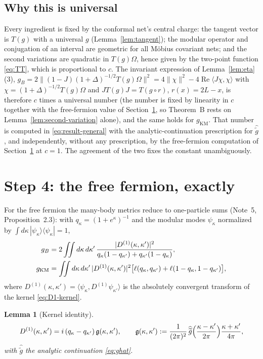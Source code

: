\documentclass[11pt]{article}
\theoremstyle{accent}
\newtheorem{lemma}[theorem]{Lemma}
\theoremstyle{definition}
\newcommand{\gh}{\widehat{\widetilde g}}
\begin{document}
\subsection{Why this is universal}
Every ingredient is fixed by the conformal net's central charge: the tangent vector is \(T(g)\) with a universal \(g\) (Lemma~\ref{lem:tangent}); the modular operator and conjugation of an interval are geometric for all M\"obius covariant nets; and the second variations are quadratic in \(T(g)\Omega\), hence given by the two-point function \eqref{eq:TT}, which is proportional to \(c\).  The invariant expression of Lemma~\ref{lem:eta}(3), \(g_B=2\|(1-J)(1+\Delta)^{-1/2}T(g)\Omega\|^2=4\|\chi\|^2-4\operatorname{Re}\langle J\chi,\chi\rangle\) with \(\chi=(1+\Delta)^{-1/2}T(g)\Omega\) and \(JT(g)J=T(g\circ r)\), \(r(x)=2L-x\), is therefore \(c\) times a universal number (the number is fixed by linearity in \(c\) together with the free-fermion value of Section~\ref{sec:fermion}, so Theorem~B rests on Lemma~\ref{lem:second-variation} alone), and the same holds for \(g_{\mathrm{KM}}\).  That number is computed in \eqref{eq:result-general} with the analytic-continuation prescription for \(\gh\), and independently, without any prescription, by the free-fermion computation of Section~\ref{sec:fermion} at \(c=1\).  The agreement of the two fixes the constant unambiguously.
\section{Step 4: the free fermion, exactly}\label{sec:fermion}

For the free fermion the many-body metrics reduce to one-particle sums (Note~5, Proposition~2.3): with \(q_\kappa=(1+e^\kappa)^{-1}\) and the modular modes \(\psi_\kappa\) normalized by \(\int d\kappa\,|\psi_\kappa\rangle\langle\psi_\kappa|=1\),
\begin{align}
 g_B&=2\iint d\kappa\,d\kappa'\,\frac{|D^{(1)}(\kappa,\kappa')|^2}{q_\kappa(1-q_{\kappa'})+q_{\kappa'}(1-q_\kappa)},\label{eq:one-particle}\\
 g_{\mathrm{KM}}&=\iint d\kappa\,d\kappa'\,|D^{(1)}(\kappa,\kappa')|^2\bigl[\ell(q_\kappa,q_{\kappa'})+\ell(1-q_\kappa,1-q_{\kappa'})\bigr],\notag
\end{align}
where \(D^{(1)}(\kappa,\kappa')=\langle\psi_\kappa,D^{(1)}\psi_{\kappa'}\rangle\) is the absolutely convergent transform of the kernel \eqref{eq:D1-kernel}.

\begin{lemma}[Kernel identity]\label{lem:kernel}
\begin{equation}\label{eq:kernel-identity}
 D^{(1)}(\kappa,\kappa')=i\,(q_\kappa-q_{\kappa'})\,\mathfrak g(\kappa,\kappa'),\qquad
 \mathfrak g(\kappa,\kappa'):=\frac{1}{(2\pi)^2}\,\gh\Bigl(\frac{\kappa-\kappa'}{2\pi}\Bigr)\frac{\kappa+\kappa'}{4\pi},
\end{equation}
with \(\gh\) the analytic continuation \eqref{eq:ghat}.
\end{lemma}
\end{document}

